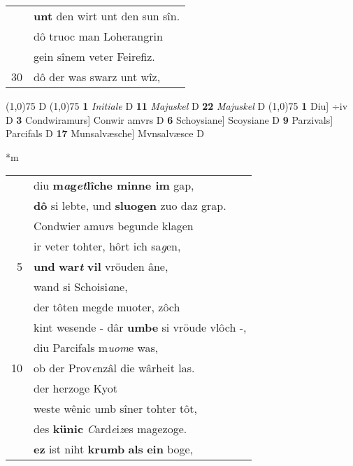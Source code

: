 \documentclass[8pt,a4paper,notitlepage]{article}
\begin{document}
\begin{table}[ht]
\begin{minipage}[t]{0.5\linewidth}
\begin{tabular}{rl}
 & \textbf{unt} den wirt unt den sun sîn.\\ 
 & dô truoc man Loherangrin\\ 
 & gein sînem veter Feirefiz.\\ 
30 & dô der was swarz unt wîz,\\ 
\end{tabular}
\scriptsize
\line(1,0){75} \newline
D \newline
\line(1,0){75} \newline
\textbf{1} \textit{Initiale} D  \textbf{11} \textit{Majuskel} D  \textbf{22} \textit{Majuskel} D  \newline
\line(1,0){75} \newline
\textbf{1} Diu] ÷iv D \textbf{3} Condwiramurs] Conwir amvrs D \textbf{6} Schoysiane] Scoysiane D \textbf{9} Parzivals] Parcifals D \textbf{17} Munsalvæsche] Mvnsalvæsce D \newline
\end{minipage}
\hspace{0.5cm}
\begin{minipage}[t]{0.5\linewidth}
\small
\begin{center}*m
\end{center}
\begin{tabular}{rl}
 & diu \textbf{m\textit{a}g\textit{et}lîche minne im} gap,\\ 
 & \textbf{dô} si lebte, und \textbf{sluogen} zuo daz grap.\\ 
 & Condwier amu\textit{r}s begunde klagen\\ 
 & ir veter tohter, hôrt ich sa\textit{g}en,\\ 
5 & \textbf{und} \textbf{war\textit{t}} \textbf{vil} vröuden âne,\\ 
 & wand si Schoisi\textit{a}ne,\\ 
 & der tôten megde muoter, zôch\\ 
 & kint wesende - dâr \textbf{umbe} si vröude vlôch -,\\ 
 & diu Parcifals m\textit{uom}e was,\\ 
10 & ob der Prov\textit{e}nzâl die wârheit las.\\ 
 & der herzoge Kyot\\ 
 & weste wênic umb sîner tohter tôt,\\ 
 & des \textbf{künic} \textit{C}ard\textit{e}i\textit{z}es magezoge.\\ 
 & \textbf{ez} ist niht \textbf{krumb} \textbf{als} \textbf{ein} boge,\\ 

\end{tabular}
\end{minipage}
\end{table}
\end{document}
